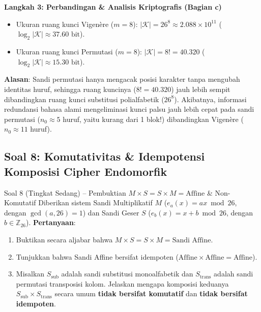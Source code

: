 \documentclass[11pt,a4paper]{article}
\begin{document}
\noindent\textbf{Langkah 3: Perbandingan \& Analisis Kriptografis (Bagian c)}
\begin{itemize}
    \item Ukuran ruang kunci Vigenère ($m=8$): $|\mathcal{K}| = 26^8 \approx 2.088 \times 10^{11}$ ($\log_2 |\mathcal{K}| \approx 37.60\text{ bit}$).
    \item Ukuran ruang kunci Permutasi ($m=8$): $|\mathcal{K}| = 8! = 40.320$ ($\log_2 |\mathcal{K}| \approx 15.30\text{ bit}$).
\end{itemize}
\textbf{Alasan}: Sandi permutasi hanya mengacak posisi karakter tanpa mengubah identitas huruf, sehingga ruang kuncinya ($8! = 40.320$) jauh lebih sempit dibandingkan ruang kunci substitusi polialfabetik ($26^8$). Akibatnya, informasi redundansi bahasa alami mengeliminasi kunci palsu jauh lebih cepat pada sandi permutasi ($n_0 \approx 5$ huruf, yaitu kurang dari 1 blok!) dibandingkan Vigenère ($n_0 \approx 11$ huruf).

\vspace{0.4cm}

\subsection{Soal 8: Komutativitas \& Idempotensi Komposisi Cipher Endomorfik}

\begin{soalsedang}{Soal 8 (Tingkat Sedang) -- Pembuktian $M \times S = S \times M = \text{Affine}$ \& Non-Komutatif}
Diberikan sistem Sandi Multiplikatif $M$ ($e_a(x) = ax \bmod 26$, dengan $\gcd(a, 26) = 1$) dan Sandi Geser $S$ ($e_b(x) = x + b \bmod 26$, dengan $b \in \mathbb{Z}_{26}$).
\textbf{Pertanyaan}:
\begin{enumerate}[label=\alph*)]
    \item Buktikan secara aljabar bahwa $M \times S = S \times M = \text{Sandi Affine}$.
    \item Tunjukkan bahwa Sandi Affine bersifat idempoten ($\text{Affine} \times \text{Affine} = \text{Affine}$).
    \item Misalkan $S_{\text{sub}}$ adalah sandi substitusi monoalfabetik dan $S_{\text{trans}}$ adalah sandi permutasi transposisi kolom. Jelaskan mengapa komposisi keduanya $S_{\text{sub}} \times S_{\text{trans}}$ secara umum \textbf{tidak bersifat komutatif} dan \textbf{tidak bersifat idempoten}.
\end{enumerate}
\end{soalsedang}
\end{document}
